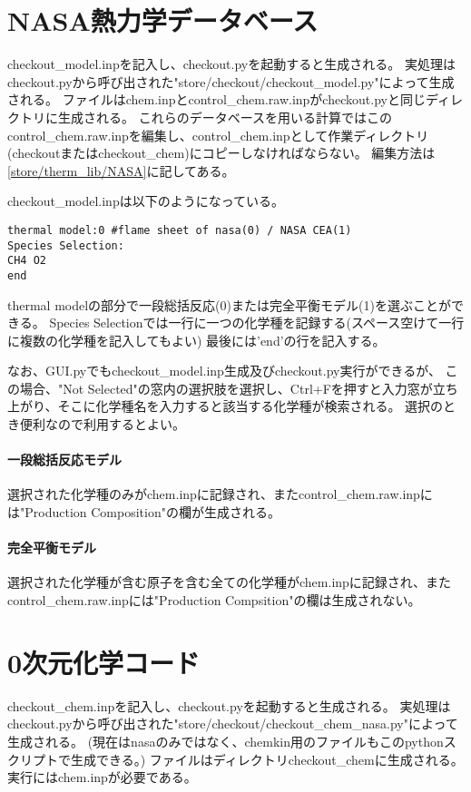 \documentclass{jsarticle}
\begin{document}
\section{NASA熱力学データベース}%
checkout\_model.inpを記入し、checkout.pyを起動すると生成される。
実処理はcheckout.pyから呼び出された"store/checkout/checkout\_model.py"によって生成される。
ファイルはchem.inpとcontrol\_chem.raw.inpがcheckout.pyと同じディレクトリに生成される。
これらのデータベースを用いる計算ではこのcontrol\_chem.raw.inpを編集し、control\_chem.inpとして作業ディレクトリ(checkoutまたはcheckout\_chem)にコピーしなければならない。
編集方法は\ref{store/therm_lib/NASA}に記してある。

checkout\_model.inpは以下のようになっている。
\begin{verbatim}
thermal model:0 #flame sheet of nasa(0) / NASA CEA(1)
Species Selection:
CH4 O2
end
\end{verbatim}
thermal modelの部分で一段総括反応(0)または完全平衡モデル(1)を選ぶことができる。
Species Selectionでは一行に一つの化学種を記録する(スペース空けて一行に複数の化学種を記入してもよい)
最後には'end'の行を記入する。

なお、GUI.pyでもcheckout\_model.inp生成及びcheckout.py実行ができるが、
この場合、"Not Selected"の窓内の選択肢を選択し、Ctrl+Fを押すと入力窓が立ち上がり、そこに化学種名を入力すると該当する化学種が検索される。
選択のとき便利なので利用するとよい。

\paragraph{一段総括反応モデル}
選択された化学種のみがchem.inpに記録され、またcontrol\_chem.raw.inpには"Production Composition"の欄が生成される。

\paragraph{完全平衡モデル}
選択された化学種が含む原子を含む全ての化学種がchem.inpに記録され、またcontrol\_chem.raw.inpには"Production Compsition"の欄は生成されない。
\newpage
\section{0次元化学コード}%
checkout\_chem.inpを記入し、checkout.pyを起動すると生成される。
実処理はcheckout.pyから呼び出された"store/checkout/checkout\_chem\_nasa.py"によって生成される。
(現在はnasaのみではなく、chemkin用のファイルもこのpythonスクリプトで生成できる。)
ファイルはディレクトリcheckout\_chemに生成される。
実行にはchem.inpが必要である。
\end{document}
